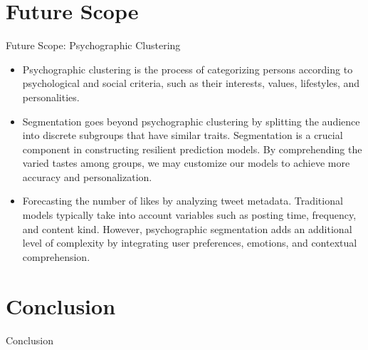 \documentclass{beamer}
\begin{document}
\section{Future Scope}
\begin{frame}{Future Scope: Psychographic Clustering}
    \begin{itemize}
        \item Psychographic clustering is the process of categorizing persons according to psychological and social criteria, such as their interests, values, lifestyles, and personalities.
        \item Segmentation goes beyond psychographic clustering by splitting the audience into discrete subgroups that have similar traits. Segmentation is a crucial component in constructing resilient prediction models. By comprehending the varied tastes among groups, we may customize our models to achieve more accuracy and personalization.
        \item Forecasting the number of likes by analyzing tweet metadata. Traditional models typically take into account variables such as posting time, frequency, and content kind. However, psychographic segmentation adds an additional level of complexity by integrating user preferences, emotions, and contextual comprehension.
    \end{itemize}
\end{frame}

    

\section{Conclusion}
\begin{frame}{Conclusion}
    
\end{frame}
\end{document}
